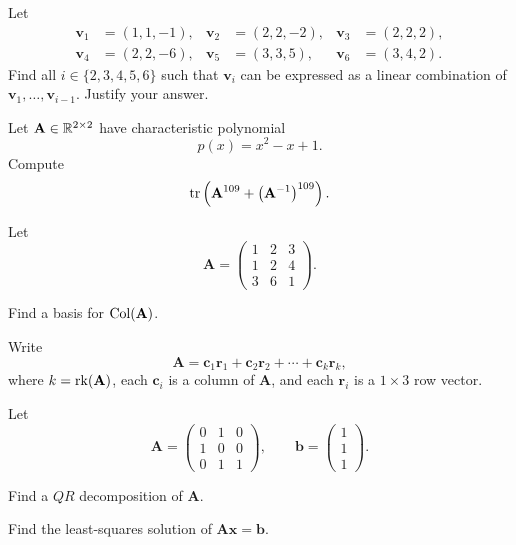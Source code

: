\documentclass[11pt,oneside]{article}
\begin{document}
\begin{problem}
Let
\[
\begin{aligned}
\mathbf v_1&=(1,1,-1),&
\mathbf v_2&=(2,2,-2),&
\mathbf v_3&=(2,2,2),\\
\mathbf v_4&=(2,2,-6),&
\mathbf v_5&=(3,3,5),&
\mathbf v_6&=(3,4,2).
\end{aligned}
\]
Find all $i\in\{2,3,4,5,6\}$ such that $\mathbf v_i$ can be expressed as a linear combination of $\mathbf v_1,\dots,\mathbf v_{i-1}$. Justify your answer.
\end{problem}

\begin{problem}
Let $\mathbf A\in\mathbb{R}^{2\times2}$ have characteristic polynomial
\[
p(x)=x^2-x+1.
\]
Compute
\[
\operatorname{tr}\left(\mathbf A^{109}+\bigl(\mathbf A^{-1}\bigr)^{109}\right).
\]
\end{problem}

\begin{problem}
Let
\[
\mathbf A=
\begin{pmatrix}
1&2&3\\
1&2&4\\
3&6&1
\end{pmatrix}.
\]
\begin{problemsubparts}
\item Find a basis for $\operatorname{Col}(\mathbf A)$.
\item Write
\[
\mathbf A=\mathbf c_1\mathbf r_1+\mathbf c_2\mathbf r_2+\cdots+\mathbf c_k\mathbf r_k,
\]
where $k=\operatorname{rk}(\mathbf A)$, each $\mathbf c_i$ is a column of $\mathbf A$, and each $\mathbf r_i$ is a $1\times3$ row vector.
\end{problemsubparts}
\end{problem}

\begin{problem}
Let
\[
\mathbf A=
\begin{pmatrix}
0&1&0\\
1&0&0\\
0&1&1
\end{pmatrix},
\qquad
\mathbf b=
\begin{pmatrix}1\\1\\1\end{pmatrix}.
\]
\begin{problemsubparts}
\item Find a $QR$ decomposition of $\mathbf A$.
\item Find the least-squares solution of $\mathbf A\mathbf x=\mathbf b$.
\end{problemsubparts}
\end{problem}
\end{document}
